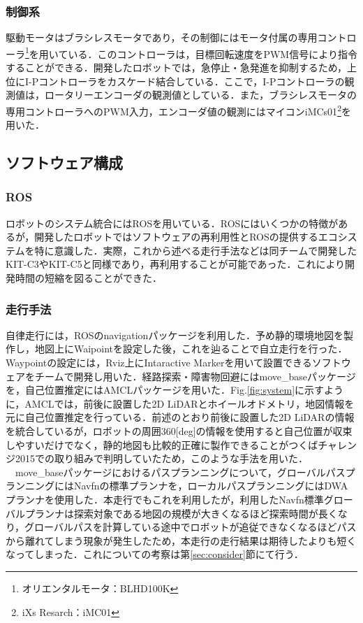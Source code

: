 \documentclass[10pt,a4paper]{jarticle}
\begin{document}
\subsubsection{制御系}
駆動モータはブラシレスモータであり，その制御にはモータ付属の専用コントローラ\footnote{オリエンタルモータ：BLHD100K}を用いている．このコントローラは，目標回転速度をPWM信号により指令することができる．開発したロボットでは，急停止・急発進を抑制するため，上位にI-Pコントローラをカスケード結合している．ここで，I-Pコントローラの観測値は，ロータリーエンコーダの観測値としている．また，ブラシレスモータの専用コントローラへのPWM入力，エンコーダ値の観測にはマイコンiMCs01\footnote{iXs Resarch：iMC01}を用いた．

\subsection{ソフトウェア構成}
\subsubsection{ROS}
ロボットのシステム統合にはROS\cite{ros}を用いている．ROSにはいくつかの特徴がある\cite{ros_okada}が，開発したロボットではソフトウェアの再利用性とROSの提供するエコシステムを特に意識した．実際，これから述べる走行手法などは同チームで開発したKIT-C3やKIT-C5と同様であり，再利用することが可能であった．これにより開発時間の短縮を図ることができた．
\subsubsection{走行手法}
自律走行には，ROSのnavigationパッケージを利用した．予め静的環境地図を製作し，地図上にWaipointを設定した後，これを辿ることで自立走行を行った．Waypointの設定には，Rviz上にIntaractive Markerを用いて設置できるソフトウェアをチームで開発し用いた．経路探索・障害物回避にはmove\_baseパッケージを，自己位置推定にはAMCLパッケージを用いた．Fig.\ref{fig:system}に示すように，AMCLでは，前後に設置した2D LiDARとホイールオドメトリ，地図情報を元に自己位置推定を行っている．前述のとおり前後に設置した2D LiDARの情報を統合しているが，ロボットの周囲360[deg]の情報を使用すると自己位置が収束しやすいだけでなく，静的地図も比較的正確に製作できることがつくばチャレンジ2015での取り組みで判明していたため，このような手法を用いた．\\
　move\_baseパッケージにおけるパスプランニングについて，グローバルパスプランニングにはNavfnの標準プランナを，ローカルパスプランニングにはDWAプランナを使用した．本走行でもこれを利用したが，利用したNavfn標準グローバルプランナは探索対象である地図の規模が大きくなるほど探索時間が長くなり，グローバルパスを計算している途中でロボットが追従できなくなるほどパスから離れてしまう現象が発生したため，本走行の走行結果は期待したよりも短くなってしまった．これについての考察は第\ref{sec:consider}節にて行う．
\end{document}
